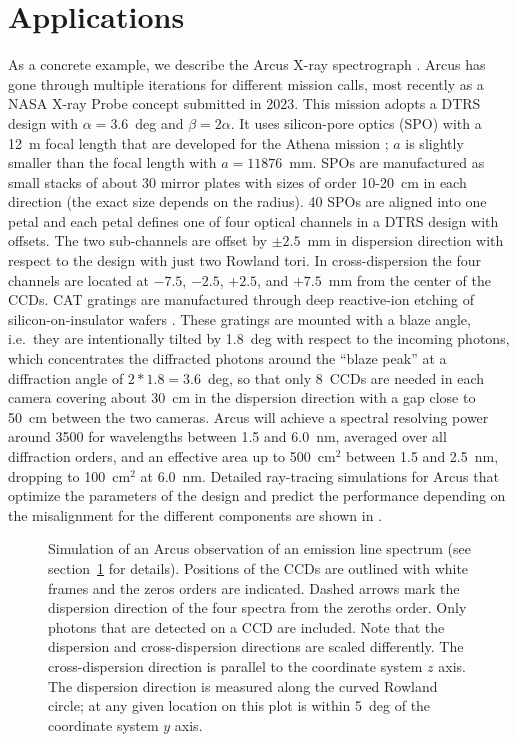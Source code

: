 \documentclass[twocolumn]{aastex631}
\begin{document}
\section{Applications}
\label{sect:applications}
As a concrete example, we describe the Arcus X-ray spectrograph  \citep{2023SPIE12678E..0ES}. Arcus has gone through multiple iterations for different mission calls, most recently as a NASA X-ray Probe concept submitted in 2023. This mission adopts a DTRS design with $\alpha=3.6$~deg and $\beta=2\alpha$. It uses silicon-pore optics (SPO) with a 12~m focal length that are developed for the Athena mission \citep{2023SPIE12679E..05G}; $a$ is slightly smaller than the focal length with $a=11876$~mm. SPOs are manufactured as small stacks of about 30 mirror plates with sizes of order 10-20~cm in each direction (the exact size depends on the radius). 40 SPOs are aligned into one petal and each petal defines one of four optical channels in a DTRS design with offsets. The two sub-channels are offset by $\pm2.5$~mm in dispersion direction with respect to the design with just two Rowland tori. In cross-dispersion the four channels are located at $-7.5$, $-2.5$, $+2.5$, and $+7.5$~mm from the center of the CCDs.
CAT gratings are manufactured through deep reactive-ion etching of silicon-on-insulator wafers \citep{2022ApJ...934..171H,2023SPIE12679E..0LH}. These gratings are mounted with a blaze angle, i.e.\ they are intentionally tilted by 1.8~deg with respect to the incoming photons, which concentrates the diffracted photons around the ``blaze peak'' at a diffraction angle of $2 * 1.8 = 3.6$~deg, so that only 8~CCDs are needed in each camera covering about 30~cm in the dispersion direction with a gap close to 50~cm between the two cameras. Arcus will achieve a spectral resolving power around 3500 for wavelengths between 1.5 and 6.0~nm, averaged over all diffraction orders, and an effective area up to 500~cm$^2$ between 1.5 and 2.5~nm, dropping to 100~cm$^2$ at 6.0~nm. Detailed ray-tracing simulations for Arcus that optimize the parameters of the design and predict the performance depending on the misalignment for the different components are shown in \citet{2017SPIE10397E..0PG,2018SPIE10699E..6FG,2023SPIE12678E..1DG}.


\begin{figure}
    \caption{Simulation of an Arcus observation of an emission line spectrum (see section~\ref{sect:applications} for details). Positions of the CCDs are outlined with white frames and the zeros orders are indicated. Dashed arrows mark the dispersion direction of the four spectra from the zeroths order. Only photons that are detected on a CCD are included. Note that the dispersion and cross-dispersion directions are scaled differently. The cross-dispersion direction is parallel to the coordinate system $z$ axis. The dispersion direction is measured along the curved Rowland circle; at any given location on this plot is within 5~deg of the coordinate system $y$ axis.
        }
    \label{fig:Arcusfull}
\end{figure}
\end{document}
